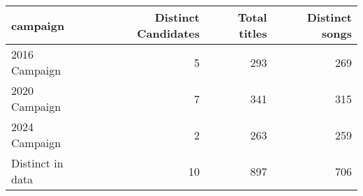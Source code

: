 \begin{table}[ht]
\centering
\begin{tabular}{lrrr}
  \hline
campaign & Distinct Candidates & Total titles & Distinct songs \\ 
  \hline
2016 Campaign & 5 & 293 & 269 \\ 
  2020 Campaign & 7 & 341 & 315 \\ 
  2024 Campaign & 2 & 263 & 259 \\ 
  Distinct in data & 10 & 897 & 706 \\ 
   \hline
\end{tabular}
\end{table}

